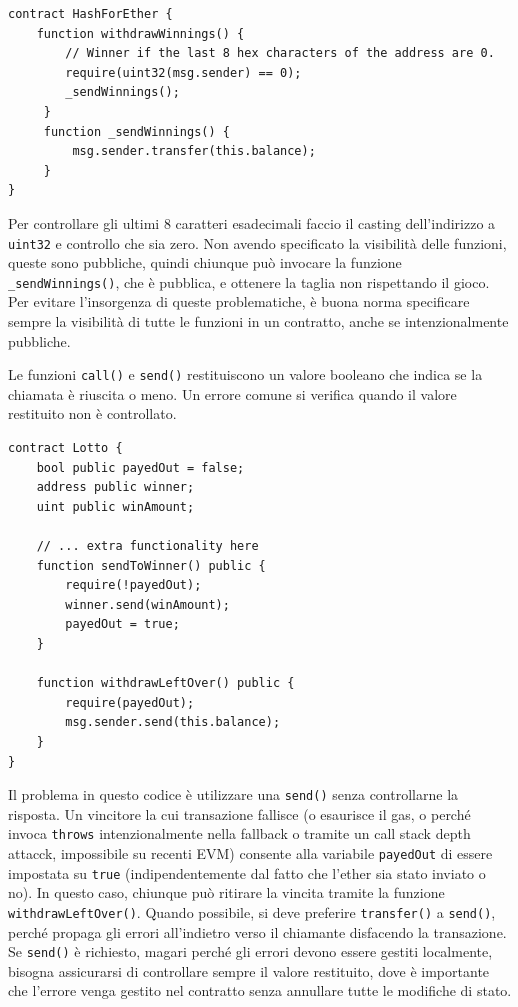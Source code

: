 \begin{lstlisting}[language = Solidity]
contract HashForEther {
    function withdrawWinnings() {
        // Winner if the last 8 hex characters of the address are 0. 
        require(uint32(msg.sender) == 0);
        _sendWinnings();
     }
     function _sendWinnings() {
         msg.sender.transfer(this.balance);
     }
}
\end{lstlisting}
Per controllare gli ultimi 8 caratteri esadecimali faccio il casting dell'indirizzo a \texttt{uint32} e controllo che sia zero. Non avendo specificato la visibilità delle funzioni, queste sono pubbliche, quindi chiunque può invocare la funzione \texttt{\_sendWinnings()}, che è pubblica, e ottenere la taglia non rispettando il gioco. Per evitare l'insorgenza di queste problematiche, è buona norma specificare sempre la visibilità di tutte le funzioni in un contratto, anche se intenzionalmente pubbliche.

Le funzioni \texttt{call()} e \texttt{send()} restituiscono un valore booleano che indica se la chiamata è riuscita o meno. Un errore comune si verifica quando il valore restituito non è controllato.
\begin{lstlisting}
contract Lotto {
    bool public payedOut = false;
    address public winner;
    uint public winAmount;
    
    // ... extra functionality here 
    function sendToWinner() public {
        require(!payedOut);
        winner.send(winAmount);
        payedOut = true;
    }
    
    function withdrawLeftOver() public {
        require(payedOut);
        msg.sender.send(this.balance);
    }
}
\end{lstlisting}
Il problema in questo codice è utilizzare una \texttt{send()} senza controllarne la risposta. Un vincitore la cui transazione fallisce (o esaurisce il gas, o perché invoca \texttt{throws} intenzionalmente nella fallback o tramite un call stack depth attacck, impossibile su recenti EVM) consente alla variabile \texttt{payedOut} di essere impostata su \texttt{true} (indipendentemente dal fatto che l'ether sia stato inviato o no). In questo caso, chiunque può ritirare la vincita tramite la funzione \texttt{withdrawLeftOver()}. Quando possibile, si deve preferire \texttt{transfer()} a \texttt{send()}, perché propaga gli errori all'indietro verso il chiamante disfacendo la transazione. Se \texttt{send()} è richiesto, magari perché gli errori devono essere gestiti localmente, bisogna assicurarsi di controllare sempre il valore restituito, dove è importante che l'errore venga gestito nel contratto senza annullare tutte le modifiche di stato.

